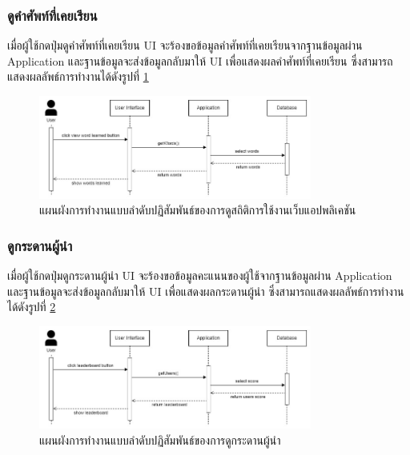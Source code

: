 \documentclass[12pt,oneside,openright,a4paper]{cpe-thai-project}
\begin{document}
\subsubsection{ดูคำศัพท์ที่เคยเรียน}
\hspace{1cm}
เมื่อผู้ใช้กดปุ่มดูคำศัพท์ที่เคยเรียน UI จะร้องขอข้อมูลคำศัพท์ที่เคยเรียนจากฐานข้อมูลผ่าน Application
และฐานข้อมูลจะส่งข้อมูลกลับมาให้ UI เพื่อแสดงผลคำศัพท์ที่เคยเรียน ซึ่งสามารถแสดงผลลัพธ์การทำงานได้ดังรูปที่ \ref{fig:S_WordsLearned}
\begin{figure}[!h]\centering
	\includegraphics[width=0.8\textwidth, keepaspectratio=true]{image/chap3/sequence/Words Learned.jpg}
	\caption{แผนผังการทำงานแบบลำดับปฏิสัมพันธ์ของการดูสถิติการใช้งานเว็บแอปพลิเคชัน}\label{fig:S_WordsLearned}
\end{figure}

\pagebreak
\subsubsection{ดูกระดานผู้นำ}
\hspace{1cm}
เมื่อผู้ใช้กดปุ่มดูกระดานผู้นำ UI จะร้องขอข้อมูลคะแนนของผู้ใช้จากฐานข้อมูลผ่าน Application
และฐานข้อมูลจะส่งข้อมูลกลับมาให้ UI เพื่อแสดงผลกระดานผู้นำ ซึ่งสามารถแสดงผลลัพธ์การทำงานได้ดังรูปที่ \ref{fig:S_Leaderboard}
\begin{figure}[!h]\centering
	\includegraphics[width=0.8\textwidth, keepaspectratio=true]{image/chap3/sequence/Leaderboard.jpg}
	\caption{แผนผังการทำงานแบบลำดับปฏิสัมพันธ์ของการดูกระดานผู้นำ}\label{fig:S_Leaderboard}
\end{figure}
\end{document}
